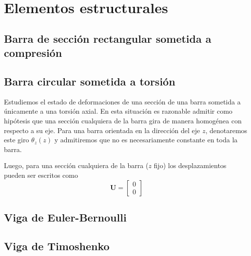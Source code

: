 \documentclass[12pt]{article}
\newcommand{\vc}[1]{\mathbf{#1}}
\begin{document}
\section{Elementos estructurales}

\subsection{Barra de sección rectangular sometida a compresión}



\subsection{Barra circular sometida a torsión}

Estudiemos el estado de deformaciones de una sección de una barra sometida a únicamente a una torsión axial. En esta situación es razonable admitir como hipótesis que una sección cualquiera de la barra gira de manera homogénea con respecto a su eje. Para una barra orientada en la dirección del eje $z$, denotaremos este giro $\theta_z(z)$ y admitiremos que no es necesariamente constante en toda la barra.

Luego, para una sección cualquiera de la barra ($z$ fijo) los desplazamientos pueden ser escritos como
\begin{equation}
\vc U = \begin{bmatrix}
0 \\ 0
\end{bmatrix}
\end{equation}


\begin{figure}[h!]
	\centering
	\begin{tikzpicture}
	
	\end{tikzpicture}
\end{figure}

\subsection{Viga de Euler-Bernoulli}

\subsection{Viga de Timoshenko}
\end{document}

